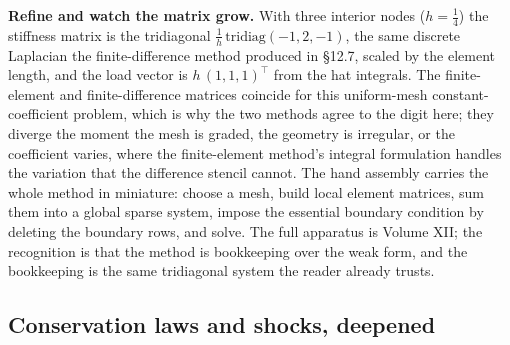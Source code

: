 \begin{mastery}
\textbf{Refine and watch the matrix grow.} With three interior nodes
($h = \tfrac{1}{4}$) the stiffness matrix is the tridiagonal
$\tfrac{1}{h}\,\mathrm{tridiag}(-1, 2, -1)$, the same discrete
Laplacian the finite-difference method produced in §12.7, scaled by
the element length, and the load vector is $h\,(1, 1, 1)^{\!\top}$
from the hat integrals. The finite-element and finite-difference
matrices coincide for this uniform-mesh constant-coefficient
problem, which is why the two methods agree to the digit here; they
diverge the moment the mesh is graded, the geometry is irregular, or
the coefficient varies, where the finite-element method's integral
formulation handles the variation that the difference stencil cannot.
The hand assembly carries the whole method in miniature: choose a
mesh, build local element matrices, sum them into a global sparse
system, impose the essential boundary condition by deleting the
boundary rows, and solve. The full apparatus is Volume XII; the
recognition is that the method is bookkeeping over the weak form,
and the bookkeeping is the same tridiagonal system the reader
already trusts.
\end{mastery}

\subsection{Conservation laws and shocks, deepened}

